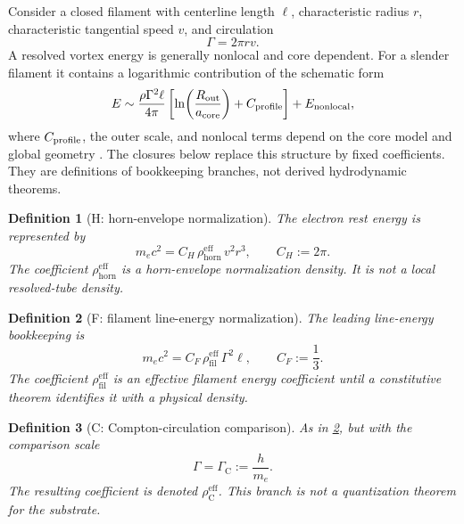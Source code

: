 \documentclass[aps,pre,preprint,notitlepage,nofootinbib,superscriptaddress]{revtex4-2}
\newcommand{\rhohorn}{\rho_{\mathrm{horn}}^{\mathrm{eff}}}
\newcommand{\rhofil}{\rho_{\mathrm{fil}}^{\mathrm{eff}}}
\newcommand{\rhoCeff}{\rho_{\mathrm C}^{\mathrm{eff}}}
\newcommand{\GammaC}{\Gamma_{\mathrm C}}
\newtheorem{definition}{Definition}
\begin{document}
Consider a closed filament with centerline length \(\ell\), characteristic radius \(r\), characteristic tangential speed \(v\), and circulation
\begin{equation}
  \Gamma=2\pi rv.
  \label{eq:circulation}
\end{equation}
A resolved vortex energy is generally nonlocal and core dependent.  For a slender filament it contains a logarithmic contribution of the schematic form
\begin{equation}
  E
  \sim
  \frac{\rho\Gamma^2\ell}{4\pi}
  \left[
    \ln\!\left(\frac{R_{\rm out}}{a_{\rm core}}\right)
    +C_{\rm profile}
  \right]
  +E_{\rm nonlocal},
  \label{eq:standard-line-energy}
\end{equation}
where \(C_{\rm profile}\), the outer scale, and nonlocal terms depend on the core model and global geometry \cite{Saffman1992}.  The closures below replace this structure by fixed coefficients.  They are definitions of bookkeeping branches, not derived hydrodynamic theorems.

\begin{definition}[H: horn-envelope normalization]
\label{def:H}
The electron rest energy is represented by
\begin{equation}
  m_ec^2
  =
  C_H\,\rhohorn\,v^2r^3,
  \qquad
  C_H:=2\pi.
  \label{eq:H}
\end{equation}
The coefficient \(\rhohorn\) is a horn-envelope normalization density.  It is not a local resolved-tube density.
\end{definition}

\begin{definition}[F: filament line-energy normalization]
\label{def:F}
The leading line-energy bookkeeping is
\begin{equation}
  m_ec^2
  =
  C_F\,\rhofil\,\Gamma^2\ell,
  \qquad
  C_F:=\frac13.
  \label{eq:F}
\end{equation}
The coefficient \(\rhofil\) is an effective filament energy coefficient until a constitutive theorem identifies it with a physical density.
\end{definition}

\begin{definition}[C: Compton-circulation comparison]
\label{def:C}
As in \cref{def:F}, but with the comparison scale
\begin{equation}
  \Gamma=\GammaC:=\frac{h}{m_e}.
  \label{eq:C}
\end{equation}
The resulting coefficient is denoted \(\rhoCeff\).  This branch is not a quantization theorem for the substrate.
\end{definition}
\end{document}
